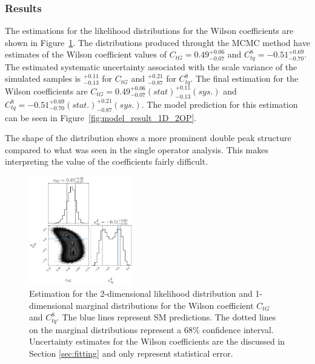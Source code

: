 \documentclass[a4paper,11pt]{article}
\begin{document}
\subsubsection{Results}

The estimations for the likelihood distributions for the Wilson coefficients are shown in Figure~\ref{fig:corner_2D_2OP}.
The distributions produced throught the MCMC method have estimates of the Wilson coefficient values of $C_{tG}=0.49_{-0.07}^{+0.06}$ and $C_{tq}^{8}=-0.51_{-0.70}^{+0.69}$.
The estimated systematic uncertainty associated with the scale variance of the simulated samples is $^{+0.11}_{-0.13}$ for $C_{tG}$ and $^{+0.21}_{-0.87}$ for $C_{tq}^{8}$. 
The final estimation for the Wilson coefficients are $C_{tG} = 0.49_{-0.07}^{+0.06}(stat) ^{+0.11}_{-0.13} (sys.)$ and $C_{tq}^{8}=-0.51_{-0.70}^{+0.69} (stat.) ^{+0.21}_{-0.87} (sys.)$.
The model prediction for this estimation can be seen in Figure~\ref{fig:model_result_1D_2OP}.

The shape of the distribution shows a more prominent double peak structure compared to what was seen in the single operator analysis.
This makes interpreting the value of the coefficients fairly difficult. 

\begin{figure}[htb]
    \centering
    \includegraphics[width=0.4\textwidth]{plots/ATLAS-ctg-ctq8_2D_2OP.png}
    \caption{Estimation for the 2-dimensional likelihood distribution and 1-dimensional marginal distributions for the Wilson coefficient $C_{tG}$ and $C_{tq}^{8}$. The blue lines represent SM predictions. The dotted lines on the marginal distributions represent a 68\% confidence interval. Uncertainty estimates for the Wilson coefficients are the discussed in Section \ref{sec:fitting} and only represent statistical error.}
    \label{fig:corner_2D_2OP}
\end{figure}
\end{document}
